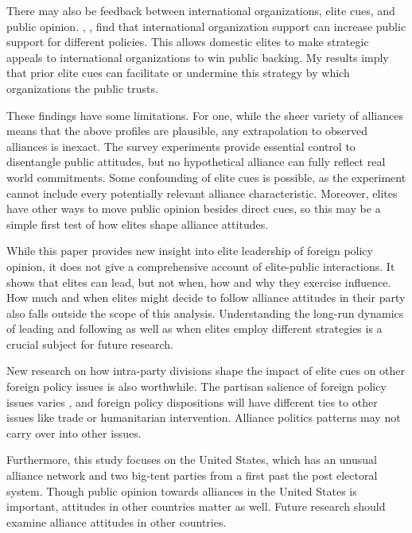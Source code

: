 \documentclass[12pt]{article}
\begin{document}
There may also be feedback between international organizations, elite cues, and public opinion.
\citet{Griecoetal2011}, \citet{Greenhill2020}, \citet{RecchiaChu2021} find that international organization support can increase public support for different policies. 
This allows domestic elites to make strategic appeals to international organizations to win public backing.
My results imply that prior elite cues can facilitate or undermine this strategy by which organizations the public trusts.


These findings have some limitations. 
For one, while the sheer variety of alliances means that the above profiles are plausible, any extrapolation to observed alliances is inexact. 
The survey experiments provide essential control to disentangle public attitudes, but no hypothetical alliance can fully reflect real world commitments.
Some confounding of elite cues is possible, as the experiment cannot include every potentially relevant alliance characteristic. 
Moreover, elites have other ways to move public opinion besides direct cues, so this may be a simple first test of how elites shape alliance attitudes. 


While this paper provides new insight into elite leadership of foreign policy opinion, it does not give a comprehensive account of elite-public interactions.
It shows that elites can lead, but not when, how and why they exercise influence. 
How much and when elites might decide to follow alliance attitudes in their party also falls outside the scope of this analysis. 
Understanding the long-run dynamics of leading and following as well as when elites employ different strategies is a crucial subject for future research. 


New research on how intra-party divisions shape the impact of elite cues on other foreign policy issues is also worthwhile. 
The partisan salience of foreign policy issues varies \citep{GuisingerSaunders2017}, and foreign policy dispositions will have different ties to other issues like trade or humanitarian intervention.
Alliance politics patterns may not carry over into other issues.


Furthermore, this study focuses on the United States, which has an unusual alliance network and two big-tent parties from a first past the post electoral system. 
Though public opinion towards alliances in the United States is important, attitudes in other countries matter as well. 
Future research should examine alliance attitudes in other countries. 
\end{document}
